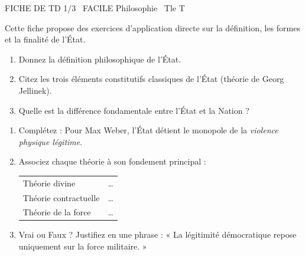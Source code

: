 \documentclass[11pt]{article}
\begin{document}
\begin{tcolorbox}[enhanced,colback=popink,colframe=popink,arc=10pt,boxrule=0pt,left=12pt,right=12pt,top=9pt,bottom=9pt]
{\color{white}\popxbold\small FICHE DE TD 1/3 \textbullet\ FACILE \hfill Philosophie \textbullet\ Tle T\par}
\end{tcolorbox}
\vspace{4pt}
Cette fiche propose des exercices d'application directe sur la définition, les formes et la finalité de l'État.

\begin{exercice}
\begin{enumerate}
    \item Donnez la définition philosophique de l'État.
    \item Citez les trois éléments constitutifs classiques de l'État (théorie de Georg Jellinek).
    \item Quelle est la différence fondamentale entre l'État et la Nation ?
\end{enumerate}
\end{exercice}

\begin{exercice}
\begin{enumerate}
    \item Complétez : Pour Max Weber, l'État détient le monopole de la \textit{violence physique légitime}.
    \item Associez chaque théorie à son fondement principal :
    \begin{tabular}{ll}
    Théorie divine & \ldots \\
    Théorie contractuelle & \ldots \\
    Théorie de la force & \ldots
    \end{tabular}
    \item Vrai ou Faux ? Justifiez en une phrase : « La légitimité démocratique repose uniquement sur la force militaire. »
\end{enumerate}
\end{exercice}
\end{document}
